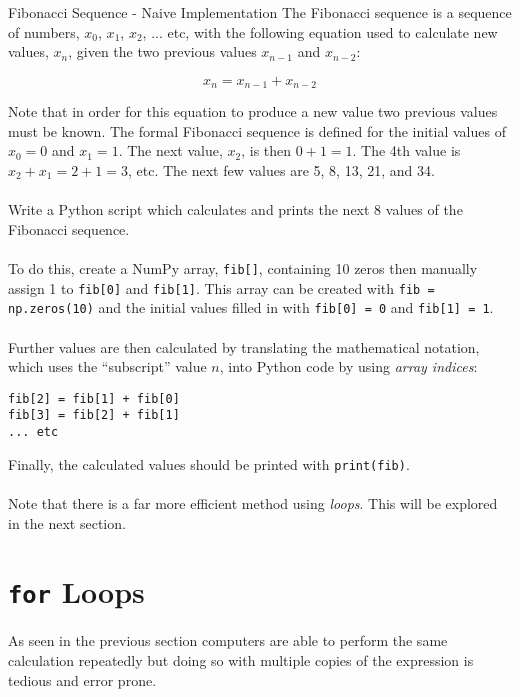 \documentclass{lab}
\begin{document}
\begin{task}{Fibonacci  Sequence - Naive Implementation}{}
The Fibonacci sequence is a sequence of numbers, $x_0$, $x_1$, $x_2$, ... etc, with the following equation used to calculate new values, $x_n$, given the two previous values $x_{n-1}$ and $x_{n-2}$:

\begin{equation}\label{eq:fib}
x_n = x_{n-1} + x_{n-2}
\end{equation}

Note that in order for this equation to produce a new value two previous values must be known. The formal Fibonacci sequence is defined for the initial values of $x_0=0$ and $x_1=1$. The next value, $x_2$, is then $0+1=1$. The 4th value is $x_2+x_1=2+1=3$, etc. The next few values are 5, 8, 13, 21, and 34.
\\~\\
Write a Python script which calculates and prints the next 8 values of the Fibonacci sequence.
\\~\\
To do this, create a NumPy array, \texttt{fib[]}, containing 10 zeros then manually assign 1 to \texttt{fib[0]} and \texttt{fib[1]}. This array can be created with \texttt{fib = np.zeros(10)} and the initial values filled in with \texttt{fib[0] = 0} and \texttt{fib[1] = 1}.
\\~\\
Further values are then calculated by translating the mathematical notation, which uses the ``subscript'' value $n$, into Python code by using \textit{array indices}:
\begin{lstlisting}
fib[2] = fib[1] + fib[0]
fib[3] = fib[2] + fib[1]
... etc
\end{lstlisting}

Finally, the calculated values should be printed with \texttt{print(fib)}.
\\~\\
Note that there is a far more efficient method using \textit{loops}. This will be explored in the next section.
\end{task}

\pagebreak

\section{\texttt{for} Loops}

As seen in the previous section computers are able to perform the same calculation repeatedly but doing so with multiple copies of the expression is tedious and error prone.
\end{document}

